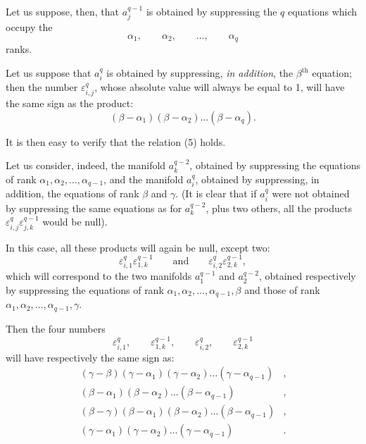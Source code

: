 \documentclass{article}
\begin{document}

Let us suppose, then, that $a^{q-1}_{j}$ is obtained by suppressing the $q$ equations which occupy the
\[ \alpha_{1}, \qquad \alpha_{2}, \qquad \ldots, \qquad \alpha_{q} \]
ranks.

Let us suppose that $a^{q}_{i}$ is obtained by suppressing, \emph{in addition}, the $\beta^{\text{th}}$ equation; then the number $\varepsilon^{q}_{i,j}$, whose absolute value will always be equal to 1, will have the same sign as the product:
\[ (\beta - \alpha_{1})(\beta - \alpha_{2}) \ldots (\beta - \alpha_{q}). \]

It is then easy to verify that the relation (5) holds.

Let us consider, indeed, the manifold $a^{q-2}_{k}$, obtained by suppressing the equations of rank $\alpha_{1}, \alpha_{2}, \ldots, \alpha_{q-1}$, and the manifold $a^{q}_{i}$, obtained by suppressing, in addition, the equations of rank $\beta$ and $\gamma$. (It is clear that if $a^{q}_{i}$ were not obtained by suppressing the same equations as for $a^{q-2}_{k}$, plus two others, all the products $\varepsilon^{q}_{i,j} \varepsilon^{q-1}_{j,k}$ would be null).

In this case, all these products will again be null, except two:
\[ \varepsilon^{q}_{i,1} \varepsilon^{q-1}_{1,k} \qquad \text{and} \qquad \varepsilon^{q}_{i,2} \varepsilon^{q-1}_{2,k}, \]
which will correspond to the two manifolds $a^{q-1}_{1}$ and $a^{q-2}_{2}$, obtained respectively by suppressing the equations of rank $\alpha_{1}, \alpha_{2}, \ldots, \alpha_{q-1}, \beta$ and those of rank $\alpha_{1}, \alpha_{2}, \ldots, \alpha_{q-1}, \gamma$.

Then the four numbers
\[ \varepsilon^{q}_{i,1}, \qquad \varepsilon^{q-1}_{1,k}, \qquad \varepsilon^{q}_{i,2}, \qquad \varepsilon^{q-1}_{2,k} \]
will have respectively the same sign as:
\[ \begin{aligned} (\gamma - \beta)(\gamma - \alpha_{1})(\gamma - \alpha_{2}) \ldots (\gamma - \alpha_{q-1})&,\\ (\beta - \alpha_{1})(\beta - \alpha_{2}) \ldots (\beta - \alpha_{q-1})&,\\ (\beta - \gamma)(\beta - \alpha_{1})(\beta - \alpha_{2}) \ldots (\beta - \alpha_{q-1})&,\\ (\gamma - \alpha_{1})(\gamma - \alpha_{2}) \ldots (\gamma - \alpha_{q-1})&. \end{aligned} \]
\end{document}
